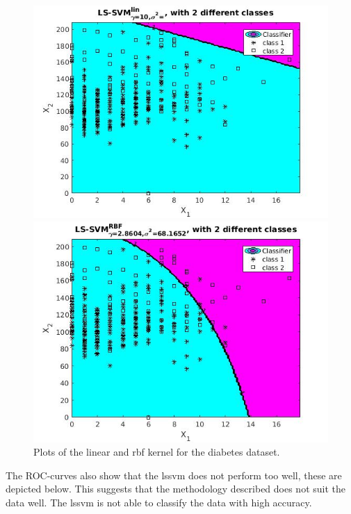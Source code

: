 \documentclass[•]{article}
\begin{document}
\begin{figure}[h!]
\centering
\begin{minipage}{.45\textwidth}
\includegraphics[width=.8\textwidth]{linbreast.jpg}
\end{minipage}
\begin{minipage}{.45\textwidth}
\includegraphics[width=.8\textwidth]{rbfbreast.jpg}
\end{minipage}
\caption{Plots of the linear and rbf kernel for the diabetes dataset.}
\end{figure}

The ROC-curves also show that the lssvm does not perform too well, these are depicted below. This suggests that the methodology described does not suit the data well. The lssvm is not able to classify the data with high accuracy.
\end{document}
